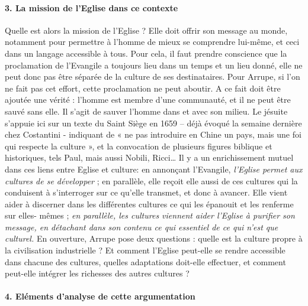  \paragraph{3.	La mission de l’Eglise dans ce contexte}


Quelle est alors la mission de l’Eglise ? Elle doit offrir son message au monde, notamment pour permettre à l’homme de mieux se comprendre lui-même, et ceci dans un langage accessible à tous. Pour cela, il faut prendre conscience que la proclamation de l’Evangile a toujours lieu dans un temps et un lieu donné, elle ne peut donc pas être séparée de la culture de ses destinataires. Pour Arrupe, si l’on ne fait pas cet effort, cette proclamation ne peut aboutir.
A ce fait doit être ajoutée une vérité : l’homme est membre d’une communauté, et il ne peut être sauvé sans elle. Il s’agit de sauver l’homme dans et avec son milieu. Le jésuite s’appuie ici sur un texte du Saint Siège en 1659 – déjà évoqué la semaine dernière chez Costantini - indiquant de « ne pas introduire en Chine un pays, mais une foi qui respecte la culture », et la convocation de plusieurs figures biblique et historiques, tels Paul, mais aussi Nobili, Ricci…
Il y a un enrichissement mutuel dans ces liens entre Eglise et culture: en annonçant l’Evangile, \textit{l’Eglise permet aux cultures de se développer} ; en parallèle, elle reçoit elle aussi de ces cultures qui la conduisent à s’interroger sur ce qu’elle transmet, et donc à avancer. Elle vient aider à discerner dans les différentes cultures ce qui les épanouit et les renferme sur elles- mêmes ; \textit{en parallèle, les cultures viennent aider l’Eglise à purifier son message, en détachant dans son contenu ce qui essentiel de ce qui n’est que culturel.}
En ouverture, Arrupe pose deux questions : quelle est la culture propre à la civilisation industrielle ? Et comment l’Eglise peut-elle se rendre accessible dans chacune des cultures, quelles adaptations doit-elle effectuer, et comment peut-elle intégrer les richesses des autres cultures ?

\paragraph{4.	Eléments d’analyse de cette argumentation
}

